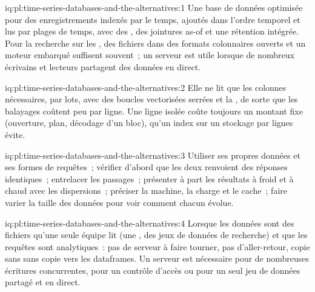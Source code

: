 \begin{solution}{iq:pl:time-series-databases-and-the-alternatives:1}
Une base de données optimisée pour des enregistrements indexés par le temps, ajoutés dans l'ordre temporel et lus par plages de temps, avec des , des jointures as-of et
une rétention intégrée. Pour la recherche sur les , des fichiers dans des formats colonnaires ouverts et un moteur embarqué suffisent souvent~; un serveur est
utile lorsque de nombreux écrivains et lecteurs partagent des données en direct.
\end{solution}

\begin{solution}{iq:pl:time-series-databases-and-the-alternatives:2}
Elle ne lit que les colonnes nécessaires, par lots, avec des boucles vectorisées serrées et la , de sorte que les balayages coûtent peu par ligne.
Une ligne isolée coûte toujours un montant fixe (ouverture, plan, décodage d'un bloc), qu'un index sur un stockage par lignes évite.
\end{solution}

\begin{solution}{iq:pl:time-series-databases-and-the-alternatives:3}
Utiliser ses propres données et ses formes de requêtes~; vérifier d'abord que les deux renvoient des réponses identiques~; entrelacer les passages~; présenter à part les résultats à froid et à chaud
avec les dispersions~; préciser la machine, la charge et le cache~; faire varier la taille des données pour voir comment chacun évolue.
\end{solution}

\begin{solution}{iq:pl:time-series-databases-and-the-alternatives:4}
Lorsque les données sont des fichiers qu'une seule équipe lit (une , des jeux de données de recherche) et que les requêtes sont analytiques~: pas de serveur à faire tourner, pas
d'aller-retour, copie sans sans copie vers les dataframes. Un serveur est nécessaire pour de nombreuses écritures concurrentes, pour un contrôle d'accès ou pour un seul jeu de données
partagé et en direct.
\end{solution}

